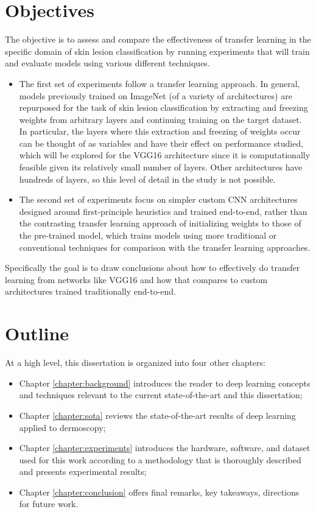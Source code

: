 \section{Objectives}

The objective is to assess and compare the effectiveness of transfer learning in the specific domain of skin lesion classification by running experiments that will train and evaluate models using various different techniques.

\begin{itemize}
    \item The first set of experiments follow a transfer learning approach. In general, models previously trained on ImageNet (of a variety of architectures) are repurposed for the task of skin lesion classification by extracting and freezing weights from arbitrary layers and continuing training on the target dataset. In particular, the layers where this extraction and freezing of weights occur can be thought of as variables and have their effect on performance studied, which will be explored for the VGG16 architecture since it is computationally feasible given its relatively small number of layers. Other architectures have hundreds of layers, so this level of detail in the study is not possible.
    \item The second set of experiments focus on simpler custom \ac{CNN} architectures designed around first-principle heuristics and trained end-to-end, rather than the contrasting transfer learning approach of initializing weights to those of the pre-trained model, which trains models using more traditional or conventional techniques for comparison with the transfer learning approaches.
\end{itemize}

Specifically the goal is to draw conclusions about how to effectively do transfer learning from networks like VGG16 and how that compares to custom architectures trained traditionally end-to-end.

\section{Outline}

At a high level, this dissertation is organized into four other chapters:

\begin{itemize}
    \item Chapter \ref{chapter:background} introduces the reader to deep learning concepts and techniques relevant to the current state-of-the-art and this dissertation;
    \item Chapter \ref{chapter:sota} reviews the state-of-the-art results of deep learning applied to dermoscopy;
    \item Chapter \ref{chapter:experiments} introduces the hardware, software, and dataset used for this work according to a methodology that is thoroughly described and presents experimental results;
    \item Chapter \ref{chapter:conclusion} offers final remarks, key takeaways, directions for future work.
\end{itemize}
